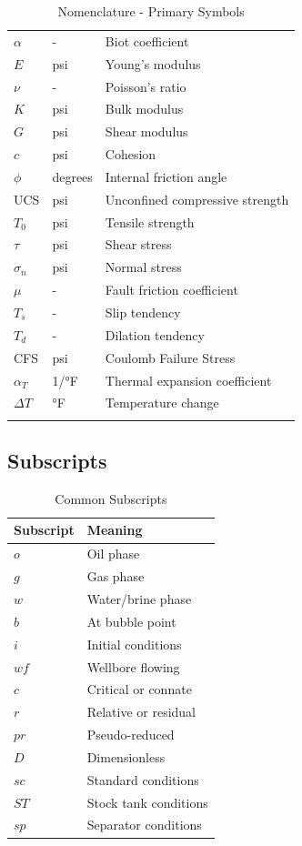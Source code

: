 \documentclass[11pt,a4paper]{article}
\begin{document}
\begin{longtable}{llp{8cm}}
$\alpha$ & - & Biot coefficient \\
$E$ & psi & Young's modulus \\
$\nu$ & - & Poisson's ratio \\
$K$ & psi & Bulk modulus \\
$G$ & psi & Shear modulus \\
$c$ & psi & Cohesion \\
$\phi$ & degrees & Internal friction angle \\
UCS & psi & Unconfined compressive strength \\
$T_0$ & psi & Tensile strength \\

$\tau$ & psi & Shear stress \\
$\sigma_n$ & psi & Normal stress \\
$\mu$ & - & Fault friction coefficient \\
$T_s$ & - & Slip tendency \\
$T_d$ & - & Dilation tendency \\
CFS & psi & Coulomb Failure Stress \\

$\alpha_T$ & 1/°F & Thermal expansion coefficient \\
$\Delta T$ & °F & Temperature change \\

\bottomrule
\caption{Nomenclature - Primary Symbols}
\end{longtable}

\subsection{Subscripts}

\begin{table}[h]
\centering
\begin{tabular}{ll}
\toprule
\textbf{Subscript} & \textbf{Meaning} \\
\midrule
$o$ & Oil phase \\
$g$ & Gas phase \\
$w$ & Water/brine phase \\
$b$ & At bubble point \\
$i$ & Initial conditions \\
$wf$ & Wellbore flowing \\
$c$ & Critical or connate \\
$r$ & Relative or residual \\
$pr$ & Pseudo-reduced \\
$D$ & Dimensionless \\
$sc$ & Standard conditions \\
$ST$ & Stock tank conditions \\
$sp$ & Separator conditions \\
\bottomrule
\end{tabular}
\caption{Common Subscripts}
\end{table}
\end{document}
